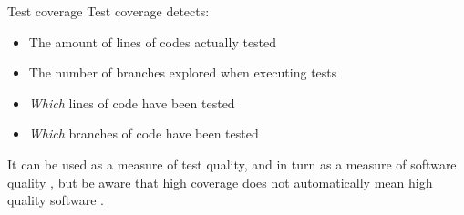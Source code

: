 \documentclass[presentation]{beamer}
\newcommand{\fnurl}[1]{\footnote{\url{#1}}}
\begin{document}
% 
\begin{frame}[fragile]{Test coverage}
    Test coverage detects:
    \begin{itemize}
        \item The amount of lines of codes actually tested
        \item The number of branches explored when executing tests
        \item \textit{Which} lines of code have been tested
        \item \textit{Which} branches of code have been tested
    \end{itemize}
    It can be used as a measure of test quality, and in turn as a measure of software quality \cite{Horgan1994}, but be aware that high coverage does not automatically mean high quality software \cite{Inozemtseva2014}. 
\end{frame}
\end{document}
